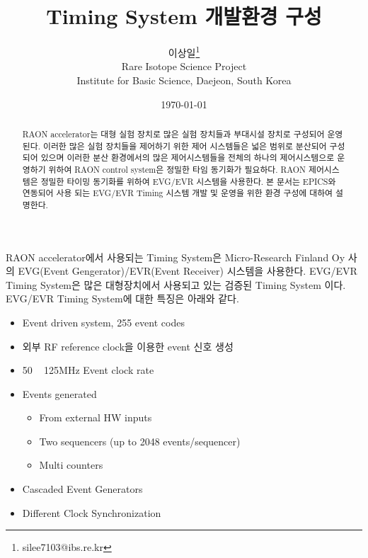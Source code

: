 \documentclass[11pt
  , a4paper
  , article
  , oneside
]{memoir}
\begin{document}
\newcommand{\technumber}{
  RAON Control-Document Series\\
  Revision : v1.0,   Release : 2015-03-03 fixed date}
\title{\textbf{Timing System 개발환경 구성}}

\author{이상일\thanks{silee7103@ibs.re.kr} \\

  Rare Isotope Science Project\\
  Institute for Basic Science, Daejeon, South Korea
}
\date{\today}

\renewcommand{\maketitlehooka}{\begin{flushright}\textsf{\technumber}\end{flushright}}

\maketitle

\begin{abstract}
RAON accelerator는 대형 실험 장치로 많은 실험 장치들과 부대시설 장치로 구성되어 운영된다. 이러한 많은 실험 장치들을 제어하기 위한 제어 시스템들은 넓은 범위로 분산되어 구성되어 있으며 이러한 분산 환경에서의 많은 제어시스템들을 전체의 하나의 제어시스템으로 운영하기 위하여 RAON control system은 정밀한 타임 동기화가 필요하다. RAON 제어시스템은 정밀한 타이밍 동기화를 위하여 EVG/EVR 시스템을 사용한다. 본 문서는 EPICS와 연동되어 사용 되는 EVG/EVR Timing 시스템 개발 및 운영을 위한 환경 구성에 대하여 설명한다.
\end{abstract}

RAON accelerator에서 사용되는 Timing System은 Micro-Research Finland Oy 사의 EVG(Event Gengerator)/EVR(Event Receiver) 시스템을 사용한다. EVG/EVR Timing System은 많은 대형장치에서 사용되고 있는 검증된 Timing System 이다. EVG/EVR Timing System에 대한 특징은 아래와 같다.

\begin{itemize}
	\item Event driven system, 255 event codes
	\item 외부 RF reference clock을 이용한 event 신호 생성
	\item 50 ~ 125MHz Event clock rate
	\item Events generated
	\begin{itemize}
			\item From external HW inputs
			\item Two sequencers (up to 2048 events/sequencer)
			\item Multi counters
	\end{itemize}
	\item Cascaded Event Generators
	\item Different Clock Synchronization
\end{itemize}
\end{document}
